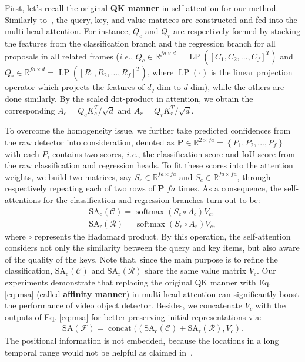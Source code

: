 \documentclass[letterpaper]{article} \usepackage{aaai23}  \usepackage{times}  \usepackage{helvet}  \usepackage{courier}  \usepackage[hyphens]{url}  \usepackage{graphicx} \urlstyle{rm} \def\UrlFont{\rm}  \usepackage{natbib}  \usepackage{caption} \usepackage{xcolor}
\begin{document}
First, let's recall the original \textbf{QK manner} in self-attention for our method. Similarly to~\cite{vaswani2017attention}, the query, key, and value matrices are constructed and fed into the multi-head attention. 
For instance, $Q_c$ and $Q_r$ are respectively formed by stacking the features from the classification branch and the regression branch for all proposals in all related frames (\emph{i.e.}, $Q_c\in\mathbb{R}^{fa\times d}=\operatorname{LP}([{C}_{1}, {C}_{2}, ..., {C}_{f}]^T)$ and $Q_r\in\mathbb{R}^{fa\times d}=\operatorname{LP}([{R}_{1}, {R}_{2}, ..., {R}_{f}]^T)$, where $\operatorname{LP}(\cdot)$ is the linear projection operator which projects the features of $d_q$-dim to $d$-dim), while the others are done similarly.
By the scaled dot-product in attention, we obtain the corresponding $A_c = Q_c K_c^{T} /\sqrt{d} $ and $A_r = Q_r K_r^{T} /\sqrt{d}$.  

To overcome the homogeneity issue, we further take predicted confidences from the raw detector into consideration, denoted as $\mathbf{P} \in \mathbb{R}^{2 \times fa} = \left\{{P}_{1}, {P}_{2}, ..., {P}_{f}\right\}$ with each $P_i$ contains two scores, \emph{i.e.}, the classification score and IoU score from the raw classification and regression heads. 
To fit these scores into the attention weights, we build two matrices, say $S_r\in\mathbb{R}^{fa\times fa}$ and $S_c\in\mathbb{R}^{fa\times fa}$, through respectively repeating each of two rows of $\mathbf{P}$ $fa$ times. As a consequence, the self-attentions for the classification and regression branches turn out to be:
\begin{equation}
\begin{array}{c}
\operatorname{SA_c}(\mathcal{C})=\operatorname{softmax}\left({S_c \circ A_c }\right) V_c,\\
\operatorname{SA_r}(\mathcal{R})=\operatorname{softmax}\left({S_r \circ A_r }\right) V_c,
\label{eq:msa}
\end{array}
\end{equation}
where $\circ$ represents the Hadamard product. By this operation, the self-attention considers not only the similarity between the query and key items, but also aware of the quality of the keys. Note that, since the main purpose is to refine the classification, $\operatorname{SA_c}(\mathcal{C})$ and $\operatorname{SA_r}(\mathcal{R})$ share the same value matrix $V_c$.
Our experiments demonstrate that replacing the original QK manner with Eq. \eqref{eq:msa} (called \textbf{affinity manner}) in multi-head attention can significantly boost the performance of video object detector. Besides, we concatenate $V_c$ with the outputs of Eq. \eqref{eq:msa} for better preserving initial representations via:
 \begin{equation}
\begin{array}{c}
\operatorname{SA(\mathcal{F})}= \operatorname{concat}((\operatorname{SA_c}(\mathcal{C})+\operatorname{SA_r}(\mathcal{R}),V_c).
\end{array}
\end{equation} 
The positional information is not embedded, because the locations in a long temporal range would not be helpful as claimed in~\cite{chen2020memory}.
\end{document}
